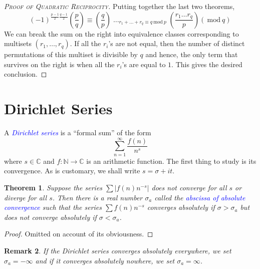 \documentclass[12pt]{article}
\theoremstyle{thmstyle}
\newtheorem{theorem}{Theorem}[section]
\theoremstyle{defstyle}
\newtheorem{remark}[theorem]{Remark}
\newcommand{\N}{\mathbb{N}}
\newcommand{\bbC}{\mathbb{C}}
\newcommand{\define}[1]{\textcolor{blue}{\textit{#1}}}
\renewcommand{\mod}{~\mathrm{mod}~}
\begin{document}
\begin{proof}[\textsc{Proof of Quadratic Reciprocity}]
    Putting together the last two theorems, 
    \begin{equation*}
        (-1)^{\frac{p - 1}{2}\frac{q - 1}{2}}\left(\frac{p}{q}\right) \equiv \left(\frac{q}{p}\right)\mathop{\sum_{r_1}\dots\sum_{r_q}}_{r_1 + \dots + r_q\equiv q\mod p}\left(\frac{r_1\dots r_q}{p}\right)(\mod q)
    \end{equation*}
    We can break the sum on the right into equivalence classes corresponding to multisets $(r_1,\dots,r_q)$. If all the $r_i$'s are not equal, then the number of distinct permutations of this multiset is divisible by $q$ and hence, the only term that survives on the right is when all the $r_i$'s are equal to $1$. This gives the desired conclusion.
\end{proof}

\newpage


\section{Dirichlet Series}

A \define{Dirichlet series} is a ``formal sum'' of the form 
\begin{equation*}
    \sum_{n = 1}^\infty \frac{f(n)}{n^s}
\end{equation*}
where $s\in\bbC$ and $f:\N\to\bbC$ is an arithmetic function. The first thing to study is its convergence. As is customary, we shall write $s = \sigma + it$.

\begin{theorem}
    Suppose the series $\sum|f(n)n^{-s}|$ does not converge for all $s$ or diverge for all $s$. Then there is a real number $\sigma_a$ called the \define{abscissa of absolute convergence} such that the series $\sum f(n)n^{-s}$ converges absolutely if $\sigma > \sigma_a$ but does not converge absolutely if $\sigma < \sigma_a$.
\end{theorem}
\begin{proof}
    Omitted on account of its obviousness.
\end{proof}
\begin{remark}
    If the Dirichlet series converges absolutely everywhere, we set $\sigma_a = -\infty$ and if it converges absolutely nowhere, we set $\sigma_a = \infty$.
\end{remark}
\end{document}
